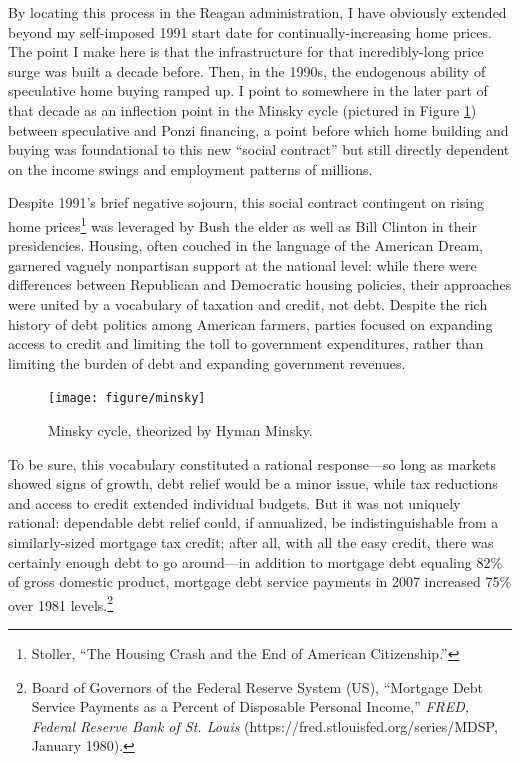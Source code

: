 \documentclass[12pt,oneside]{psthesis}
\begin{document}
By locating this process in the Reagan administration, I have obviously extended beyond my self-imposed 1991 start date for continually-increasing home prices.
The point I make here is that the infrastructure for that incredibly-long price surge was built a decade before.
Then, in the 1990s, the endogenous ability of speculative home buying ramped up.
I point to somewhere in the later part of that decade as an inflection point in the Minsky cycle (pictured in Figure \ref{fig:minsky}) between speculative and Ponzi financing, a point before which home building and buying was foundational to this new ``social contract'' but still directly dependent on the income swings and employment patterns of millions.

Despite 1991's brief negative sojourn, this social contract contingent on rising home prices\footnote{Stoller, ``The Housing Crash and the End of American Citizenship.''} was leveraged by Bush the elder as well as Bill Clinton in their presidencies.
Housing, often couched in the language of the American Dream, garnered vaguely nonpartisan support at the national level: while there were differences between Republican and Democratic housing policies, their approaches were united by a vocabulary of taxation and credit, not debt.
Despite the rich history of debt politics among American farmers, parties focused on expanding access to credit and limiting the toll to government expenditures, rather than limiting the burden of debt and expanding government revenues.
\begin{figure}

{\centering \texttt{[image: figure/minsky]} 

}

\caption{Minsky cycle, theorized by Hyman Minsky.}\label{fig:minsky}
\end{figure}
To be sure, this vocabulary constituted a rational response---so long as markets showed signs of growth, debt relief would be a minor issue, while tax reductions and access to credit extended individual budgets.
But it was not uniquely rational: dependable debt relief could, if annualized, be indistinguishable from a similarly-sized mortgage tax credit; after all, with all the easy credit, there was certainly enough debt to go around---in addition to mortgage debt equaling 82\% of gross domestic product, mortgage debt service payments in 2007 increased 75\% over 1981 levels.\footnote{Board of Governors of the Federal Reserve System (US), ``Mortgage Debt Service Payments as a Percent of Disposable Personal Income,'' \emph{FRED, Federal Reserve Bank of St. Louis} (https://fred.stlouisfed.org/series/MDSP, January 1980).}
\end{document}
